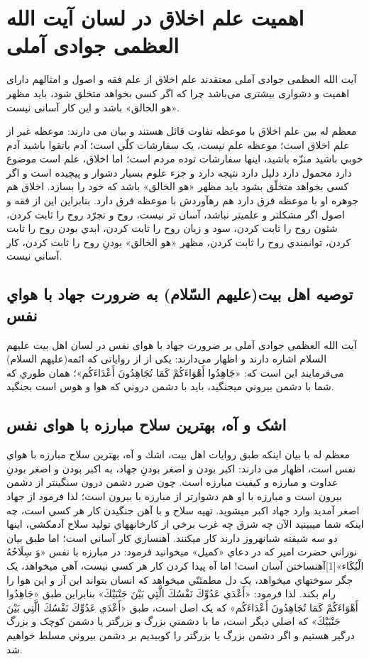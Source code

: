 \section{اهمیت علم اخلاق در لسان آیت الله العظمی جوادی آملی}
آیت الله العظمی جوادی آملی معتقدند علم اخلاق از علم فقه و اصول و امثالهم دارای اهمیت و دشواری بیشتری می‌باشد چرا که اگر کسی بخواهد متخلق شود، باید مظهر «هو الخالق» باشد و این کار آسانی نیست. 

معظم له بین علم اخلاق با موعظه تفاوت قائل هستند و بیان می دارند:
موعظه غير از علم اخلاق است؛ موعظه علم نيست، يک سفارشات کلّي است؛ آدم باتقوا باشيد آدم خوبي باشيد منزّه باشيد، اينها سفارشات توده مردم است؛ اما اخلاق، علم است موضوع دارد محمول دارد دليل دارد نتيجه دارد و جزء علوم بسيار دشوار و پيچيده است و اگر کسي بخواهد متخلّق بشود بايد مظهر «هو الخالق» باشد که خود را بسازد.
 اخلاق هم جوهره او با موعظه فرق دارد هم رهآوردش با موعظه فرق دارد. بنابراين اين از فقه و اصول اگر مشکلتر و علميتر نباشد، آسان تر نيست،  روح و تجرّد روح را ثابت کردن، شئون روح را ثابت کردن، سود و زيان روح را ثابت کردن، ابدي بودن روح را ثابت کردن، توانمندي روح را ثابت کردن، مظهر «هو الخالق» بودنِ روح را ثابت کردن، کار آساني نيست.

\subsection{توصيه اهل بيت(عليهم السّلام) به ضرورت جهاد با هواي نفس}
آیت الله العظمی جوادی آملی بر ضرورت جهاد با هوای نفس در لسان اهل بیت علیهم السلام اشاره دارند و اظهار می‌دارند: یکی از از روایاتی که ائمه(عليهم السلام) می‌فرمایند این است که: «جَاهِدُوا أَهْوَاءَكُمْ كَمَا تُجَاهِدُونَ أَعْدَاءَكُم‏»؛ همان طوري که شما با دشمن بيروني مي﻿جنگيد، بايد با دشمن دروني که هوا و هوس است بجنگيد.

\subsection{اشک و آه، بهترین سلاح مبارزه با هوای نفس}
معظم له  با بیان اینکه طبق روایات اهل بیت، اشك و آه، بهترين سلاح مبارزه با هواي نفس است، اظهار می دارند:
اکبر بودن و اصغر بودنِ جهاد، به اکبر بودن و اصغر بودنِ عداوت و مبارزه و کيفيت مبارزه است. چون ضرر دشمن درون سنگين﻿تر از دشمن بيرون است و مبارزه با او هم دشوارتر از مبارزه با بيرون است؛ لذا فرمود از جهاد اصغر آمديد وارد جهاد اکبر مي﻿شويد. تهيه سلاح و با آهن جنگيدن کار هر کسي است، چه اينکه شما مي﻿بينيد الآن چه شرق چه غرب برخي از کارخانه﻿هاي توليد سلاح آدم﻿کشي، اينها دو سه شيفته شبانه﻿روز دارند کار مي﻿کنند. آهن﻿سازي کار آساني است؛ اما طبق بيان نوراني حضرت امير که در دعاي «کميل» مي﻿خوانيد فرمود: در مبارزه با نفس «وَ سِلَاحُهُ‏ الْبُكَاء»[1]آهن﻿ساختن آسان است! اما  آه پيدا کردن کار هر کسي نيست، آهي مي﻿خواهد، يک جگر سوخته﻿اي مي﻿خواهد، يک دل مطمئنّي مي﻿خواهد که انسان بتواند اين آز و اين هوا را رام بکند. لذا فرمود: «أَعْدَي عَدُوِّكَ نَفْسُكَ الَّتِي بَيْنَ جَنْبَيْكَ»
بنابراين طبق «جَاهِدُوا أَهْوَاءَكُمْ كَمَا تُجَاهِدُونَ أَعْدَاءَكُم‏» که يک اصل است، طبق «أَعْدَي عَدُوِّكَ نَفْسُكَ الَّتِي بَيْنَ جَنْبَيْكَ» که اصلي ديگر است، ما با دشمني بزرگ و بزرگ﻿تر يا دشمن کوچک و بزرگ درگير هستيم و اگر دشمن بزرگ يا بزرگ﻿تر را کوبيديم بر دشمن بيروني مسلط خواهيم شد.

